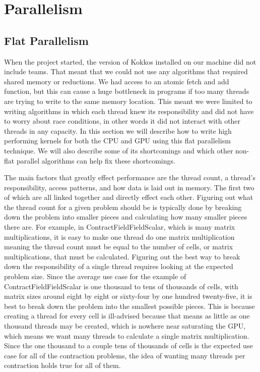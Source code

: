 \chapter{Parallelism}

\section{Flat Parallelism}
When the project started, the version of Kokkos installed on our machine did not include teams. That meant that we could not use any algorithms that required shared memory or reductions. We had access to an atomic fetch and add function, but this can cause a huge bottleneck in programs if too many threads are trying to write to the same memory location. This meant we were limited to writing algorithms in which each thread knew its responsibility and did not have to worry about race conditions, in other words it did not interact with other threads in any capacity. In this section we will describe how to write high performing kernels for both the CPU and GPU using this flat parallelism technique. We will also describe some of its shortcomings and which other non-flat parallel algorithms can help fix these shortcomings.

The main factors that greatly effect performance are the thread count, a thread's responsibility, access patterns, and how data is laid out in memory. The first two of which are all linked together and directly effect each other. Figuring out what the thread count for a given problem should be is typically done by breaking down the problem into smaller pieces and calculating how many smaller pieces there are. For example, in ContractFieldFieldScalar, which is many matrix multiplications, it is easy to make one thread do one matrix multiplication meaning the thread count must be equal to the number of cells, or matrix multiplications, that must be calculated. Figuring out the best way to break down the responsibility of a single thread requires looking at the expected problem size. Since the average use case for the example of ContractFieldFieldScalar is one thousand to tens of thousands of cells, with matrix sizes around 
eight by eight or sixty-four by one hundred twenty-five, it is best to break down the problem into the smallest possible pieces. This is because creating a thread for every cell is ill-advised because that means as little as one thousand threads may be created, which is nowhere near saturating the GPU, which means we want many threads to calculate a single matrix multiplication. Since the one thousand to a couple tens of thousands of cells is the expected use case for all of the contraction problems, the idea of wanting many threads per contraction holds true for all of them. 

